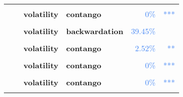 \documentclass[
  authoryear,
  preprint,
  3p]{elsarticle}
\begin{document}
\begin{longtable}[t]{>{}l>{}l>{}l>{}l>{}r>{}r}
\textbf{\cellcolor{gray!10}{}} & \textbf{\cellcolor{gray!10}{post-crisis}} & \textbf{\cellcolor{gray!10}{mean}} & \textbf{\cellcolor{gray!10}{backwardation}} & \textcolor[HTML]{4285f4}{\cellcolor{gray!10}{34.23\%}} & \textcolor[HTML]{4285f4}{\cellcolor{gray!10}{}}\\
\textbf{} & \textbf{} & \textbf{volatility} & \textbf{contango} & \textcolor[HTML]{4285f4}{0\%} & \textcolor[HTML]{4285f4}{\vphantom{18} ***}\\
\textbf{\cellcolor{gray!10}{Heating oil (XNYM)}} & \textbf{\cellcolor{gray!10}{past}} & \textbf{\cellcolor{gray!10}{mean}} & \textbf{\cellcolor{gray!10}{backwardation}} & \textcolor[HTML]{4285f4}{\cellcolor{gray!10}{21.83\%}} & \textcolor[HTML]{4285f4}{\cellcolor{gray!10}{}}\\
\addlinespace
\textbf{} & \textbf{} & \textbf{volatility} & \textbf{backwardation} & \textcolor[HTML]{4285f4}{39.45\%} & \textcolor[HTML]{4285f4}{}\\
\textbf{\cellcolor{gray!10}{}} & \textbf{\cellcolor{gray!10}{financialisation}} & \textbf{\cellcolor{gray!10}{mean}} & \textbf{\cellcolor{gray!10}{contango}} & \textcolor[HTML]{4285f4}{\cellcolor{gray!10}{99.52\%}} & \textcolor[HTML]{4285f4}{\cellcolor{gray!10}{}}\\
\textbf{} & \textbf{} & \textbf{volatility} & \textbf{contango} & \textcolor[HTML]{4285f4}{2.52\%} & \textcolor[HTML]{4285f4}{**}\\
\textbf{\cellcolor{gray!10}{}} & \textbf{\cellcolor{gray!10}{crisis}} & \textbf{\cellcolor{gray!10}{mean}} & \textbf{\cellcolor{gray!10}{backwardation}} & \textcolor[HTML]{4285f4}{\cellcolor{gray!10}{23.31\%}} & \textcolor[HTML]{4285f4}{\cellcolor{gray!10}{}}\\
\textbf{} & \textbf{} & \textbf{volatility} & \textbf{contango} & \textcolor[HTML]{4285f4}{0\%} & \textcolor[HTML]{4285f4}{\vphantom{17} ***}\\
\addlinespace
\textbf{\cellcolor{gray!10}{}} & \textbf{\cellcolor{gray!10}{post-crisis}} & \textbf{\cellcolor{gray!10}{mean}} & \textbf{\cellcolor{gray!10}{backwardation}} & \textcolor[HTML]{4285f4}{\cellcolor{gray!10}{15.71\%}} & \textcolor[HTML]{4285f4}{\cellcolor{gray!10}{}}\\
\textbf{} & \textbf{} & \textbf{volatility} & \textbf{contango} & \textcolor[HTML]{4285f4}{0\%} & \textcolor[HTML]{4285f4}{\vphantom{16} ***}\\
\textbf{\cellcolor{gray!10}{Copper (XCEC)}} & \textbf{\cellcolor{gray!10}{past}} & \textbf{\cellcolor{gray!10}{mean}} & \textbf{\cellcolor{gray!10}{backwardation}} & \textcolor[HTML]{4285f4}{\cellcolor{gray!10}{90.64\%}} & \textcolor[HTML]{4285f4}{\cellcolor{gray!10}{}}\\

\end{longtable}
\end{document}
